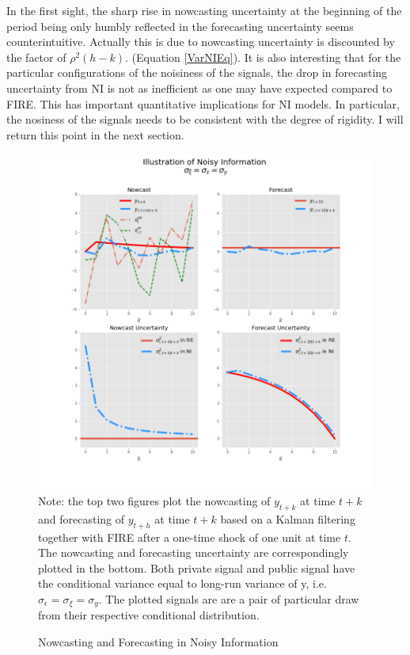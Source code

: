 \documentclass[]{article}
\begin{document}
	In the first sight, the sharp rise in nowcasting uncertainty at the beginning of the period being only humbly reflected in the forecasting uncertainty seems counterintuitive. Actually this is due to nowcasting uncertainty is discounted by the factor of $\rho^2(h-k)$.  (Equation \ref{VarNIEq}). It is also interesting that for the particular configurations of the noisiness of the signals, the drop in forecasting uncertainty from NI is not as inefficient as one may have expected compared to FIRE.  This has important quantitative implications for NI models. In particular, the nosiness of the signals needs to be consistent with the degree of rigidity. I will return this point in the next section.  
	
	\begin{figure}[ht]
		\centering
		\includegraphics[width=13cm]{figures/ni_illustration.png}  \\
		{\footnotesize Note: the top two figures plot the nowcasting of $y_{t+k}$  at time $t+k$ and forecasting of $y_{t+h}$ at time $t+k$  based on a Kalman filtering together with FIRE after a one-time shock of one unit at time $t$. The nowcasting and forecasting uncertainty are correspondingly plotted in the bottom. Both private signal and public signal have the conditional variance equal to long-run variance of y, i.e.  $\sigma_\epsilon = \sigma_\xi = \sigma_y$. The plotted signals are are a pair of particular draw from their respective conditional distribution. }
		\caption{Nowcasting and Forecasting in Noisy Information}
		\label{IllustrateNI}
	\end{figure}
	
\end{document}
